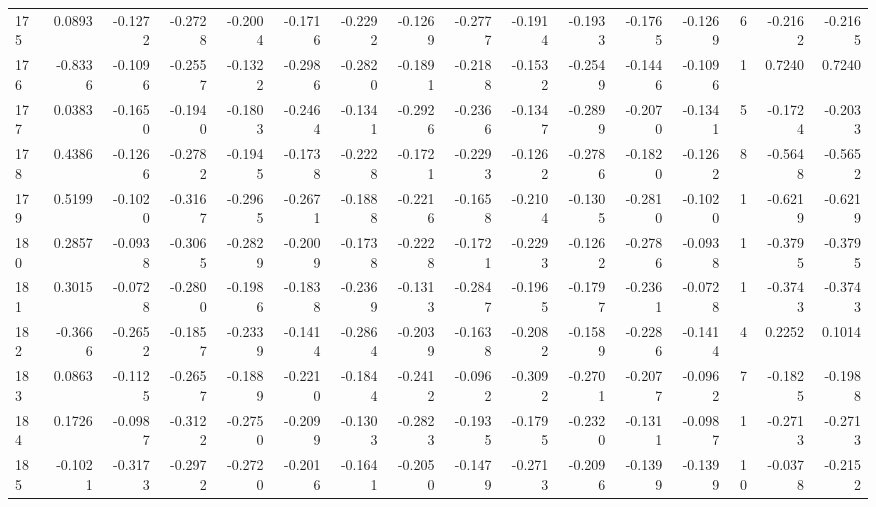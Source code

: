 \begin{tabular}{lrrrrrrrrrrrrrrr}
175 &      0.0893 & -0.1272 & -0.2728 & -0.2004 & -0.1716 & -0.2292 & -0.1269 & -0.2777 & -0.1914 & -0.1933 &  -0.1765 &    -0.1269 &      6 &                   -0.2162 &                    -0.2165 \\
176 &     -0.8336 & -0.1096 & -0.2557 & -0.1322 & -0.2986 & -0.2820 & -0.1891 & -0.2188 & -0.1532 & -0.2549 &  -0.1446 &    -0.1096 &      1 &                    0.7240 &                     0.7240 \\
177 &      0.0383 & -0.1650 & -0.1940 & -0.1803 & -0.2464 & -0.1341 & -0.2926 & -0.2366 & -0.1347 & -0.2899 &  -0.2070 &    -0.1341 &      5 &                   -0.1724 &                    -0.2033 \\
178 &      0.4386 & -0.1266 & -0.2782 & -0.1945 & -0.1738 & -0.2228 & -0.1721 & -0.2293 & -0.1262 & -0.2786 &  -0.1820 &    -0.1262 &      8 &                   -0.5648 &                    -0.5652 \\
179 &      0.5199 & -0.1020 & -0.3167 & -0.2965 & -0.2671 & -0.1888 & -0.2216 & -0.1658 & -0.2104 & -0.1305 &  -0.2810 &    -0.1020 &      1 &                   -0.6219 &                    -0.6219 \\
180 &      0.2857 & -0.0938 & -0.3065 & -0.2829 & -0.2009 & -0.1738 & -0.2228 & -0.1721 & -0.2293 & -0.1262 &  -0.2786 &    -0.0938 &      1 &                   -0.3795 &                    -0.3795 \\
181 &      0.3015 & -0.0728 & -0.2800 & -0.1986 & -0.1838 & -0.2369 & -0.1313 & -0.2847 & -0.1965 & -0.1797 &  -0.2361 &    -0.0728 &      1 &                   -0.3743 &                    -0.3743 \\
182 &     -0.3666 & -0.2652 & -0.1857 & -0.2339 & -0.1414 & -0.2864 & -0.2039 & -0.1638 & -0.2082 & -0.1589 &  -0.2286 &    -0.1414 &      4 &                    0.2252 &                     0.1014 \\
183 &      0.0863 & -0.1125 & -0.2657 & -0.1889 & -0.2210 & -0.1844 & -0.2412 & -0.0962 & -0.3092 & -0.2701 &  -0.2077 &    -0.0962 &      7 &                   -0.1825 &                    -0.1988 \\
184 &      0.1726 & -0.0987 & -0.3122 & -0.2750 & -0.2099 & -0.1303 & -0.2823 & -0.1935 & -0.1795 & -0.2320 &  -0.1311 &    -0.0987 &      1 &                   -0.2713 &                    -0.2713 \\
185 &     -0.1021 & -0.3173 & -0.2972 & -0.2720 & -0.2016 & -0.1641 & -0.2050 & -0.1479 & -0.2713 & -0.2096 &  -0.1399 &    -0.1399 &     10 &                   -0.0378 &                    -0.2152 \\

\end{tabular}
